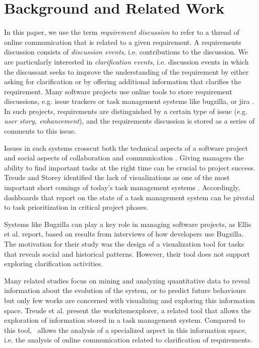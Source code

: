 \section{Background and Related Work}
In this paper, we use the term \emph{requirement discussion} to refer to a thread of online communication that is related to a given requirement. 
A requirements discussion consists of \emph{discussion events}, i.e. contributions to the discussion.
We are particularly interested in \emph{clarification events}, i.e. discussion events in which the discussant seeks to improve the understanding of the requirement by either asking for clarification or by offering additional information that clarifies the requirement.
Many software projects use online tools to store requirement discussions, e.g. issue trackers or task management systems like bugzilla, or jira \cite{Ernst2012}. 
In such projects, requirements are distinguished by a certain type of issue (e.g. \emph{user story, enhancement}), and the requirements discussion is stored as a series of comments to this issue.

Issues in such systems crosscut both the technical aspects of a software project and social aspects of collaboration and communication \cite{Kraut1995}. 
Giving managers the ability to find important tasks at the right time can be crucial to project success.
Treude and Storey identified the lack of visualizations as one of the most important short comings of today's task management systems \cite{Treude2010}. 
Accordingly, dashboards that report on the state of a task management system can be pivotal to task prioritization in critical project phases.

Systems like Bugzilla can play a key role in managing software projects, as Ellis et al. \cite{Ellis2007} report, based on results from interviews of how developers use Bugzilla. 
The motivation for their study was the design of a visualization tool for tasks that reveals social and historical patterns.
However, their tool does not support exploring clarification activities.

Many related studies focus on mining and analyzing quantitative data to reveal information about the evolution of the system, or to predict future behaviours but only few works are concerned with visualizing and exploring this information space. 
Treude et al. \cite{Treude2012} present the workitemexplorer, a related tool that allows the exploration of information stored in a task management system.
Compared to this tool, \viss\ allows the analysis of a specialized aspect in this information space, i.e. the analysis of online communication related to clarification of requirements. 